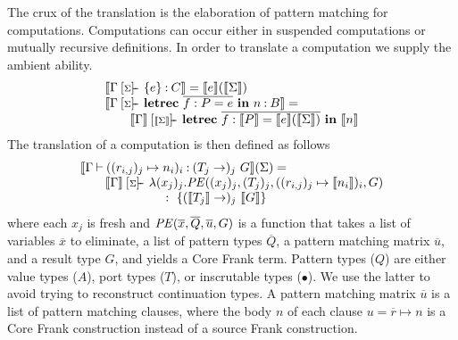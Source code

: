 \documentclass[12pt]{article}
\makeatletter
\newcommand{\many}{\overline}
\newcommand{\sem}[1]{\llbracket{#1}\rrbracket}
\newcommand\ba{\begin{array}}
\newcommand\ea{\end{array}}
\newcommand{\bl}{\ba[t]{@{}l@{}}}
\newcommand{\el}{\ea}
\newenvironment{syntax}{\[\ba{@{}l@{~}r@{~}c@{~}l@{}}}{\ea\]\ignorespacesafterend}
\newcommand{\sigentails}[1]{\mathbin{[{\text{\scriptsize ${#1}$}}]\!\text{-\!-}}\,}
\newcommand{\checkbase}[4]{#2 \mathbin{#1} #4 \mathbin{:} #3}
\newcommand{\has}[4]{\checkbase{\sigentails{#2}}{#1}{#3}{#4}}
\newcommand{\does}[3]{\checkbase{\vdash}{#1}{#2}{#3}}
\newcommand{\hasgs}{\has{\Gamma}{\sigs}}
\newcommand{\doesg}{\does{\Gamma}}
\newcommand{\checksgs}{\hasgs}
\newcommand{\checksdefg}{\doesg}
\newcommand{\sigs}{\Sigma}
\newcommand{\key}[1]{\textbf{#1}} %
\newcommand{\thunk}[1]{\{{#1}\}}
\newcommand\slab[1]{(\textrm{#1})}
\makeatother
\begin{document}
The crux of the translation is the elaboration of pattern matching for
computations. Computations can occur either in suspended computations
or mutually recursive definitions. In order to translate a computation
we supply the ambient ability.
%
\[
\bl
\sem{\checksgs{C}{\thunk{e}}} = \sem{e}(\sem{\sigs}) \\
\sem{\checksgs{B}{\key{letrec}~\many{f : P = e}~\key{in}~n}} = \\
\qquad
  \sem{\Gamma} \sigentails{\sem{\sigs}} \key{letrec}~\many{f : \sem{P} = \sem{e}(\sem{\sigs})}~\key{in}~\sem{n} \\
\el
\]
The translation of a computation is then defined as follows
\[
\bl
\sem{\checksdefg{(T_j \to)_j~ G}{{((r_{i,j})_j \mapsto n_i)_i}}}(\sigs) = \\
\qquad
 \sem{\Gamma} \sigentails{\sigs}
   \bl
   \lambda (x_j)_j.
     \PE((x_j)_j, (T_j)_j, ((r_{i,j})_j \mapsto \sem{n_i})_i, G) \\
   \quad~:~\thunk{(\sem{T_j} \to)_j~ \sem{G}}
   \el \\
\el
\]
where each $x_j$ is fresh and $\PE(\many{x}, \many{Q}, \many{u}, G)$
is a function that takes a list of variables $\many{x}$ to eliminate,
a list of pattern types $\many{Q}$, a pattern matching matrix
$\many{u}$, and a result type $G$, and yields a Core Frank term.
%
Pattern types ($Q$) are either value types ($A$), port types ($T$), or
inscrutable types ($\bullet$). We use the latter to avoid trying to
reconstruct continuation types.
%
%
A pattern matching matrix $\many{u}$ is a list of pattern matching
clauses, where the body $n$ of each clause $u = \many{r} \mapsto n$ is
a Core Frank construction instead of a source Frank construction.
\end{document}
